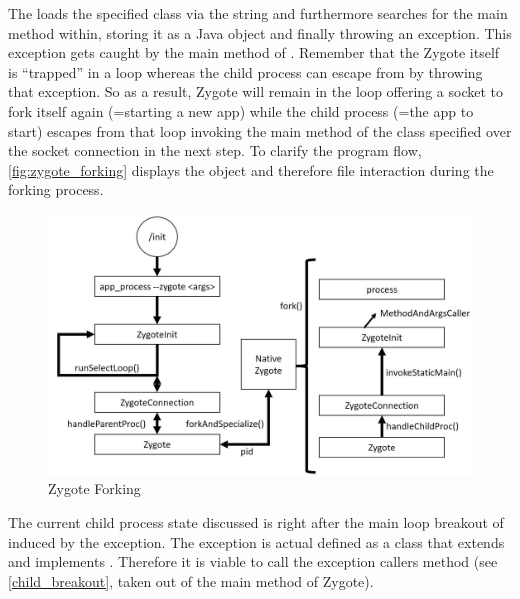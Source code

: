 The  loads the specified class via the  string and furthermore searches for the main method within, storing it as a Java  object and finally throwing an
 exception. This exception gets caught by the main method of .
Remember that the Zygote itself is ``trapped'' in a loop whereas the child process can escape from by throwing that exception. So as a result, Zygote will remain in the loop offering a socket to fork itself again (=starting a new app) while the child process (=the app to start) escapes from that loop invoking the main method of the class specified over the socket
connection in the next step.
To clarify the program flow, \autoref{fig:zygote_forking} displays
the object and therefore file interaction during the forking process.

\begin{figure}[htb]
  \centering
  \includegraphics[width={\textwidth}]{figures/zygote_forking}
  \caption[Zygote Forking]{Zygote Forking}
  \label{fig:zygote_forking}
\end{figure}


The current child process state discussed is right after the main loop
breakout of  induced by the exception. The exception
is actual defined as a class that extends  and implements
. Therefore it is viable to call the exception callers
 method (see \autoref{child_breakout}, taken out of the main
method of Zygote).




